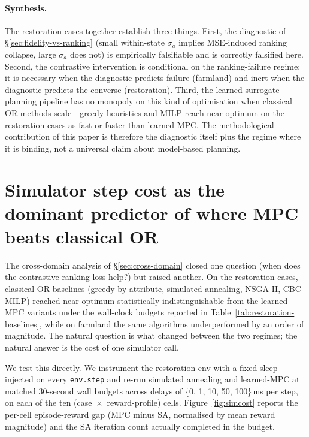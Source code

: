 \documentclass[11pt]{article}
\begin{document}
\paragraph{Synthesis.} The restoration cases together establish three things. First, the diagnostic of \S\ref{sec:fidelity-vs-ranking} (small within-state $\sigma_a$ implies MSE-induced ranking collapse, large $\sigma_a$ does not) is empirically falsifiable and is correctly falsified here. Second, the contrastive intervention is conditional on the ranking-failure regime: it is necessary when the diagnostic predicts failure (farmland) and inert when the diagnostic predicts the converse (restoration). Third, the learned-surrogate planning pipeline has no monopoly on this kind of optimisation when classical OR methods scale---greedy heuristics and MILP reach near-optimum on the restoration cases as fast or faster than learned MPC. The methodological contribution of this paper is therefore the diagnostic itself plus the regime where it is binding, not a universal claim about model-based planning.


\section{Simulator step cost as the dominant predictor of where MPC beats classical OR}\label{sec:simcost}

The cross-domain analysis of \S\ref{sec:cross-domain} closed one question (when does the contrastive ranking loss help?) but raised another. On the restoration cases, classical OR baselines (greedy by attribute, simulated annealing, NSGA-II, CBC-MILP) reached near-optimum statistically indistinguishable from the learned-MPC variants under the wall-clock budgets reported in Table~\ref{tab:restoration-baselines}, while on farmland the same algorithms underperformed by an order of magnitude. The natural question is what changed between the two regimes; the natural answer is the cost of one simulator call.

We test this directly. We instrument the restoration env with a fixed sleep injected on every \texttt{env.step} and re-run simulated annealing and learned-MPC at matched 30-second wall budgets across delays of \{0, 1, 10, 50, 100\}\,ms per step, on each of the ten (case~$\times$~reward-profile) cells. Figure~\ref{fig:simcost} reports the per-cell episode-reward gap (MPC minus SA, normalised by mean reward magnitude) and the SA iteration count actually completed in the budget.
\end{document}
